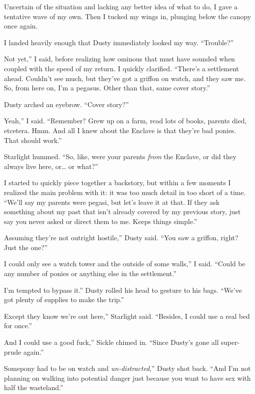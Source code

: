 Uncertain of the situation and lacking any better idea of what to do, I gave a tentative wave of my own. Then I tucked my wings in, plunging below the canopy once again.

I landed heavily enough that Dusty immediately looked my way. “Trouble?”

\leavevmode{}Not yet,” I said, before realizing how ominous that must have sounded when coupled with the speed of my return. I quickly clarified. “There’s a settlement ahead. Couldn’t see much, but they’ve got a griffon on watch, and they saw me. So, from here on, I’m a pegasus. Other than that, same cover story.”

Dusty arched an eyebrow. “Cover story?”

\leavevmode{}Yeah,” I said. “Remember? Grew up on a farm, read lots of books, parents died, etcetera. Hmm. And all I knew about the Enclave is that they’re bad ponies. That should work.”

Starlight hummed. “So, like, were your parents \textit{from} the Enclave, or did they always live here, or… or what?”

I started to quickly piece together a backstory, but within a few moments I realized the main problem with it: it was too much detail in too short of a time. “We’ll say my parents were pegasi, but let’s leave it at that. If they ask something about my past that isn’t already covered by my previous story, just say you never asked or direct them to me. Keeps things simple.”

\leavevmode{}Assuming they’re not outright hostile,” Dusty said. “You saw a griffon, right? Just the one?”

\leavevmode{}I could only see a watch tower and the outside of some walls,” I said. “Could be any number of ponies or anything else in the settlement.”

\leavevmode{}I’m tempted to bypass it.” Dusty rolled his head to gesture to his bags. “We’ve got plenty of supplies to make the trip.”

\leavevmode{}Except they know we’re out here,” Starlight said. “Besides, I could use a real bed for once.”

\leavevmode{}And I could use a good fuck,” Sickle chimed in. “Since Dusty’s gone all super-prude again.”

\leavevmode{}Somepony had to be on watch and \textit{un-distracted},” Dusty shot back. “And I’m not planning on walking into potential danger just because you want to have sex with half the wasteland.”

